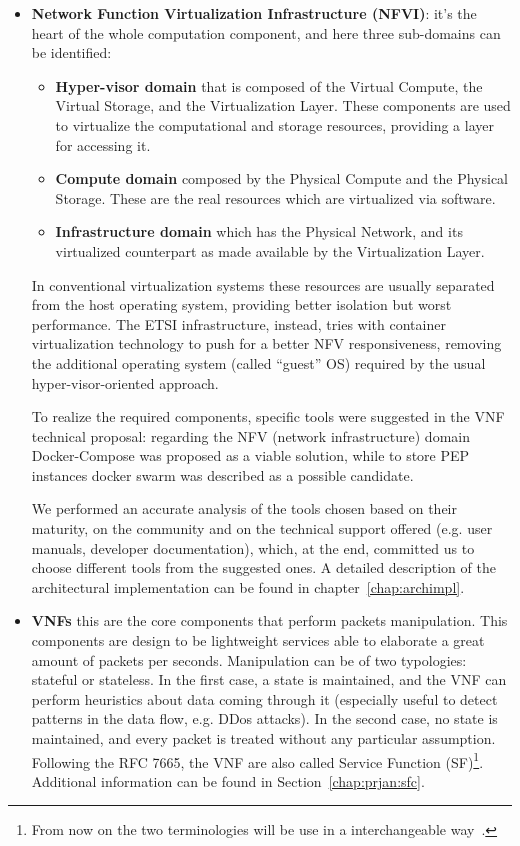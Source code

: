 \begin{itemize}
 \item \textbf{Network Function Virtualization Infrastructure (NFVI)}: it's the
   heart of the whole computation component, and here three sub-domains can be
   identified: 
\begin{itemize} 
 \item \textbf{Hyper-visor domain} that is composed of the Virtual Compute, the
   Virtual Storage, and the Virtualization Layer. These components are used to
   virtualize the computational and storage resources, providing a layer for
   accessing it.
 \item \textbf{Compute domain} composed by the Physical Compute and the Physical
   Storage. These are the real resources which are virtualized via software.
 \item \textbf{Infrastructure domain} which has the Physical Network, and its
   virtualized counterpart as made available by the Virtualization Layer.
\end{itemize}

In conventional virtualization systems these resources are usually separated
from the host operating system, providing better isolation but worst
performance. The ETSI infrastructure, instead, tries with container
virtualization technology to push for a better NFV responsiveness, removing the
additional operating system (called ``guest'' OS) required by the usual
hyper-visor-oriented approach.

To realize the required components, specific tools were suggested in the VNF
technical proposal: regarding the NFV (network infrastructure) domain
Docker-Compose was proposed as a viable solution, while to store PEP instances
docker swarm was described as a possible candidate.

We performed an accurate analysis of the tools chosen based on their maturity,
on the community and on the technical support offered (e.g. user manuals,
developer documentation), which, at the end, committed us to choose different
tools from the suggested ones. A detailed description of the architectural
implementation can be found in chapter~\ref{chap:archimpl}.

\item \textbf{VNFs} this are the core components that perform packets
  manipulation. This components are design to be lightweight services able to
  elaborate a great amount of packets per seconds. Manipulation can be of two
  typologies: stateful or stateless. In the first case, a state is maintained,
  and the VNF can perform heuristics about data coming through it (especially
  useful to detect patterns in the data flow, e.g. DDos attacks). In the second
  case, no state is maintained, and every packet is treated without any
  particular assumption. Following the RFC 7665, the VNF are also called Service
  Function (SF)\footnote{From now on the two terminologies will be use in a
    interchangeable way~\cite{medhat2017service}.}. Additional information can
  be found in Section~\ref{chap:prjan:sfc}.


\end{itemize}
